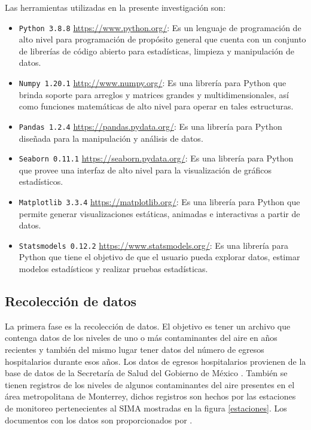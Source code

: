 Las herramientas utilizadas en la presente investigación son:

\begin{itemize}
	\item \texttt{Python 3.8.8} \url{https://www.python.org/}: Es un lenguaje de programación de alto nivel para programación de propósito general que cuenta con un conjunto de librerías de código abierto para estadísticas, limpieza y manipulación de datos.
	\item \texttt{Numpy 1.20.1} \url{http://www.numpy.org/}: Es una librería para Python que brinda soporte para arreglos y matrices grandes y multidimensionales, así como funciones matemáticas de alto nivel para operar en tales estructuras.  
	\item \texttt{Pandas 1.2.4} \url{https://pandas.pydata.org/}: Es una librería para Python diseñada para la manipulación y análisis de datos.
	\item \texttt{Seaborn 0.11.1} \url{https://seaborn.pydata.org/}: Es una librería para Python que provee una interfaz de alto nivel para la visualización de gráficos estadísticos.
	\item \texttt{Matplotlib 3.3.4} \url{https://matplotlib.org/}: Es una librería para Python que permite generar visualizaciones estáticas, animadas e interactivas a partir de datos.
	\item \texttt{Statsmodels 0.12.2} \url{https://www.statsmodels.org/}: Es una librería para Python que tiene el objetivo de que el usuario pueda explorar datos, estimar modelos estadísticos y realizar pruebas estadísticas.
\end{itemize}

\subsection{Recolección de datos}
La primera fase es la recolección de datos. El objetivo es tener un archivo que contenga datos de los niveles de uno o más  contaminantes del aire en años recientes y también del mismo lugar tener datos del número de egresos hospitalarios durante esos años. Los datos de egresos hospitalarios provienen de la base de datos de la Secretaría de Salud del Gobierno de México \cite{f1}. También se tienen registros de los niveles de algunos contaminantes del aire presentes en el área metropolitana de Monterrey, dichos registros son hechos por las estaciones de monitoreo pertenecientes al SIMA \cite{f2} mostradas en la figura \ref{estaciones}. Los documentos con los datos son proporcionados por \citeauthor{f3}.

